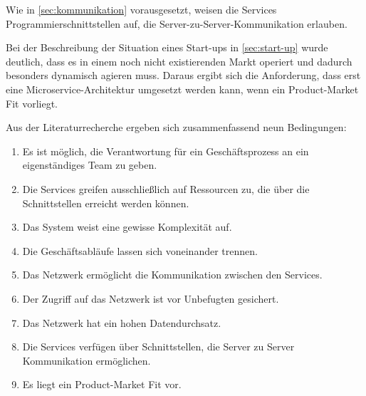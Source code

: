 Wie in \cref{sec:kommunikation} vorausgesetzt, weisen die Services Programmierschnittstellen auf, die Server-zu-Server-Kommunikation erlauben.

Bei der Beschreibung der Situation eines Start-ups in \cref{sec:start-up} wurde deutlich, dass es in einem noch nicht existierenden Markt operiert und dadurch besonders dynamisch agieren muss. Daraus ergibt sich die Anforderung, dass erst eine Microservice-Architektur umgesetzt werden kann, wenn ein Product-Market Fit vorliegt.

Aus der Literaturrecherche ergeben sich zusammenfassend neun Bedingungen:
\begin{enumerate}
	\item Es ist möglich, die Verantwortung für ein Geschäftsprozess an ein eigenständiges Team zu geben.
	\item Die Services greifen ausschließlich auf Ressourcen zu, die über die Schnittstellen erreicht werden können.
	\item Das System weist eine gewisse Komplexität auf.
	\item Die Geschäftsabläufe lassen sich voneinander trennen.
	\item Das Netzwerk ermöglicht die Kommunikation zwischen den Services.
	\item Der Zugriff auf das Netzwerk ist vor Unbefugten gesichert.
	\item Das Netzwerk hat ein hohen Datendurchsatz.
	\item Die Services verfügen über Schnittstellen, die Server zu Server Kommunikation ermöglichen.
	\item Es liegt ein Product-Market Fit vor.
\end{enumerate}